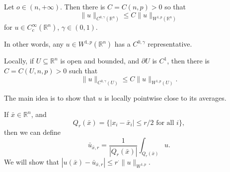 \documentclass[12pt]{article}
\begin{document}
\begin{theorem}
	Let $o \in (n, +\infty).$ Then there is $C = C(n, p) > 0$ so that
	\[
	\|u\|_{C^{0, \gamma}(\mathbb{R}^n)} \leq C \|u\|_{W^{1,p}(\mathbb{R}^n)}
	\]
	for $u \in C^{\infty}_c(\mathbb{R}^n)$, $\gamma \in (0, 1)$.

	In other words, any $u \in W^{1,p}(\mathbb{R}^n)$ has a $C^{0, \gamma}$ representative.

	Locally, if $U \subseteq \mathbb{R}^n$ is open and bounded, and $\partial U$ is $C^1$, then there is $C  = C(U, n, p) > 0$ such that
	\[
	\|u\|_{C^{0, \gamma} (U)} \leq C \|u\|_{W^{1,p}(U)}.
	\]
\end{theorem}

\begin{proofbox}
	The main idea is to show that $u$ is locally pointwise close to its averages.

	If $\bar x \in \mathbb{R}^n$, and 
	\[
		Q_r(\bar x) = \{ |x_i - \bar x_i| \leq r/2 \text{ for all } i \},
	\]
	then we can define
	\[
	\bar u_{\bar x, r} = \frac{1}{|Q_r(\bar x)|} \int_{Q_r(\bar x)} u.
	\]
	We will show that $|u(\bar x) - \bar u_{\bar x, r}| \leq r^{\cdot} \|u\|_{W^{1,p}}$.
\end{proofbox}



\newpage

\printindex
\end{document}

